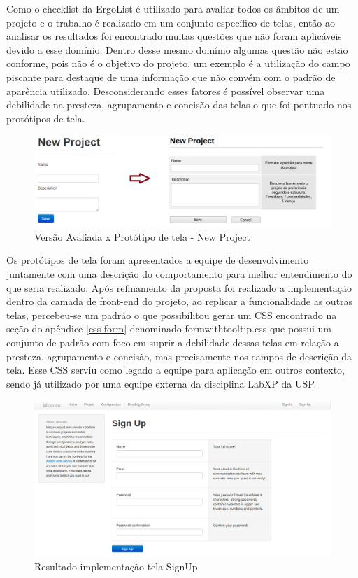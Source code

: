 Como o checklist da ErgoList é utilizado para avaliar todos os âmbitos de um projeto e o trabalho é realizado em um conjunto específico de telas, então ao analisar os resultados foi encontrado muitas questões que não foram aplicáveis devido a esse domínio. Dentro desse mesmo domínio algumas questão não estão conforme, pois não é o objetivo do projeto, um exemplo é a utilização do campo piscante para destaque de uma informação que não convém com o padrão de aparência utilizado. Desconsiderando esses fatores é possível observar uma debilidade na presteza, agrupamento e concisão das telas o que foi pontuado nos protótipos de tela.

\graphicspath{{figuras/}}
\begin{figure}[H]
\centering
\includegraphics[width=1.0\textwidth]{PrototipoNewProject}
\caption{Versão Avaliada x Protótipo de tela - New Project}
\label{parallel-coordinate}
\end{figure}

Os protótipos de tela foram apresentados a equipe de desenvolvimento juntamente com uma descrição do comportamento para melhor entendimento do que seria realizado. Após refinamento da proposta foi realizado a implementação dentro da camada de front-end do projeto, ao replicar a funcionalidade as outras telas, percebeu-se um padrão o que possibilitou gerar um CSS encontrado na seção do apêndice \ref{css-form} denominado formwithtooltip.css que possui um conjunto de padrão com foco em suprir a debilidade dessas telas em relação a presteza, agrupamento e concisão, mas precisamente nos campos de descrição da tela. Esse CSS serviu como legado a equipe para aplicação em outros contexto, sendo já utilizado por uma equipe externa da disciplina LabXP da USP.

\graphicspath{{figuras/}}
\begin{figure}[H]
\centering
\includegraphics[width=1.0\textwidth]{TelaSignUp}
\caption{Resultado implementação tela SignUp}
\label{parallel-coordinate}
\end{figure}

